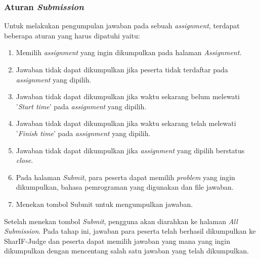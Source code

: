 \subsubsection{Aturan \textit{Submission}}
\label{sec: Aturan Submission}
Untuk melakukan pengumpulan jawaban pada sebuah \textit{assignment}, terdapat beberapa aturan yang harus dipatuhi yaitu:
\begin{enumerate}
    \item Memilih \textit{assignment} yang ingin dikumpulkan pada halaman \textit{Assignment}.
    \item Jawaban tidak dapat dikumpulkan jika peserta tidak terdaftar pada \textit{assignment} yang dipilih.
    \item Jawaban tidak dapat dikumpulkan jika waktu sekarang belum melewati ’\textit{Start time}’ pada \textit{assignment} yang dipilih.
    \item Jawaban tidak dapat dikumpulkan jika waktu sekarang telah melewati ’\textit{Finish time}’ pada \textit{assignment} yang dipilih.
    \item Jawaban tidak dapat dikumpulkan jika \textit{assignment} yang dipilih berstatus \textit{close}.
    \item Pada halaman \textit{Submit}, para peserta dapat memilih \textit{problem} yang ingin dikumpulkan, bahasa pemrograman yang digunakan dan file jawaban.
    \item Menekan tombol Submit untuk mengumpulkan jawaban.
\end{enumerate}
    Setelah menekan tombol \textit{Submit}, pengguna akan diarahkan ke halaman \textit{All Submission}. Pada tahap ini, jawaban para peserta telah berhasil dikumpulkan ke SharIF-Judge dan peserta dapat memilih jawaban yang mana yang ingin dikumpulkan dengan mencentang salah satu jawaban yang telah dikumpulkan.
    
